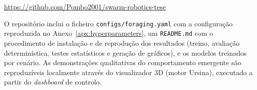 \documentclass[12pt,reqno, twoside]{amsbook}
\theoremstyle{plain}
\numberwithin{equation}{chapter}
\numberwithin{section}{chapter}
\numberwithin{table}{chapter}
\numberwithin{figure}{chapter}
\begin{document}
\begin{center}
\url{https://github.com/Pombo2001/swarm-robotics-tese}
\end{center}

\noindent O repositório inclui o ficheiro \texttt{configs/foraging.yaml} com a configuração reproduzida no Anexo~\ref{apx:hyperparameters}, um \texttt{README.md} com o procedimento de instalação e de reprodução dos resultados (treino, avaliação determinística, testes estatísticos e geração de gráficos), e os modelos treinados por cenário. As demonstrações qualitativas do comportamento emergente são reproduzíveis localmente através do visualizador 3D (motor Ursina), executado a partir do \textit{dashboard} de controlo.
\end{document}
